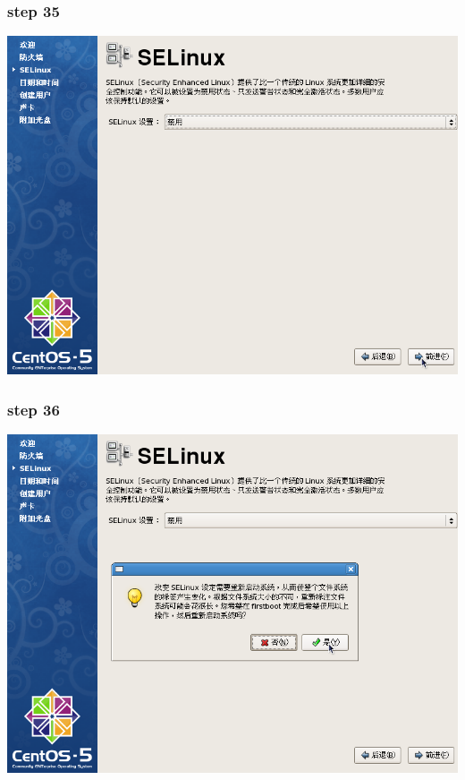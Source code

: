 \documentclass[xcolor=svgnames,presentation]{beamer}
\begin{document}
\begin{frame}
\frametitle{step 35}
\label{sec-2-35}

\begin{center}
\includegraphics[width=.9\linewidth]{img/img57.png}
\end{center}
\end{frame}
\begin{frame}
\frametitle{step 36}
\label{sec-2-36}

\begin{center}
\includegraphics[width=.9\linewidth]{img/img58.png}
\end{center}
\end{frame}
\end{document}
